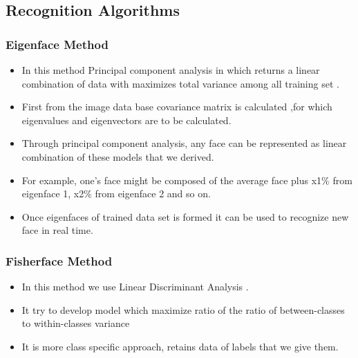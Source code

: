 \documentclass[conference]{IEEEtran}
\begin{document}
\subsection{Recognition Algorithms}

\subsubsection{Eigenface Method}
\begin{itemize}
	\item In this method Principal component analysis in which returns a linear combination of data with maximizes total variance among all training set \cite{facerec}. 
	\item First from the image data base covariance matrix is calculated ,for which eigenvalues and eigenvectors are to be calculated. 
	\item Through principal component analysis, any face can be represented as linear combination of these models that we derived.
	\item For example, one's face might be composed of the average face plus x1\% from eigenface 1, x2\% from eigenface 2 and so on.                                         
	\item Once eigenfaces of trained data set is formed it can be used to recognize new    face in real time.
\end{itemize}

\subsubsection{Fisherface Method}
\begin{itemize}
	\item In this method we use Linear Discriminant Analysis \cite{facerec}. 
	\item It try to develop model which maximize ratio of the ratio of between-classes to within-classes variance
	\item It is more class specific approach, retains data of labels that we give them.
\end{itemize}
\end{document}
